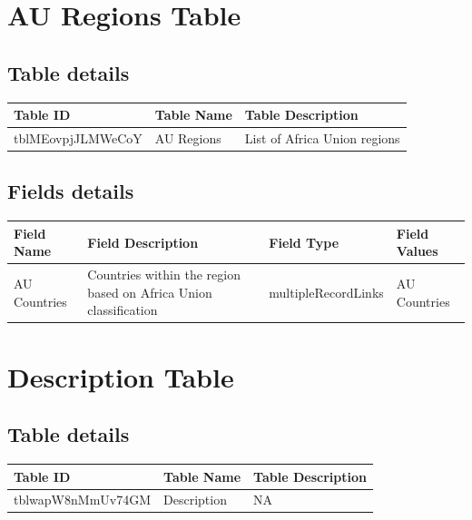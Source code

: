\documentclass[
]{book}
\begin{document}
\hypertarget{au-regions-table}{%
\section{AU Regions Table}\label{au-regions-table}}

\hypertarget{table-details-2}{%
\subsection{Table details}\label{table-details-2}}

\begin{table}
\centering
\begin{tabular}{l|l|l}
\hline
\textbf{Table ID} & \textbf{Table Name} & \textbf{Table Description}\\
\hline
tblMEovpjJLMWeCoY & AU Regions & List of Africa Union regions\\
\hline
\end{tabular}
\end{table}

\hypertarget{fields-details-2}{%
\subsection{Fields details}\label{fields-details-2}}

\begin{table}
\centering
\begin{tabular}{l|l|l|l}
\hline
\textbf{Field Name} & \textbf{Field Description} & \textbf{Field Type} & \textbf{Field Values}\\
\hline
AU Countries & Countries within the region based on Africa Union classification & multipleRecordLinks & AU Countries\\
\hline
\end{tabular}
\end{table}

\hypertarget{description-table}{%
\section{Description Table}\label{description-table}}

\hypertarget{table-details-3}{%
\subsection{Table details}\label{table-details-3}}

\begin{table}
\centering
\begin{tabular}{l|l|l}
\hline
\textbf{Table ID} & \textbf{Table Name} & \textbf{Table Description}\\
\hline
tblwapW8nMmUv74GM & Description & NA\\
\hline
\end{tabular}
\end{table}
\end{document}

